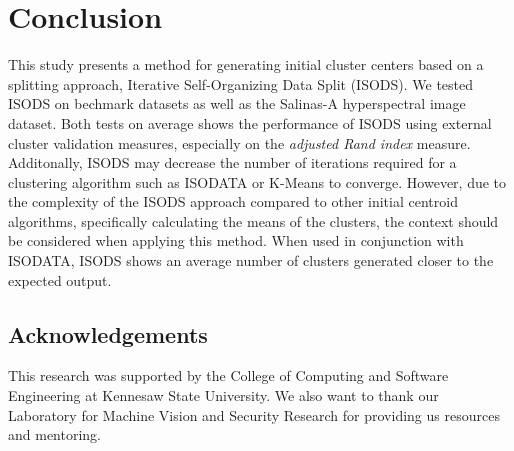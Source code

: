 \documentclass[a4paper, 10pt]{article}
\begin{document}
\section{Conclusion}
This study presents a method for generating initial cluster centers based on a
splitting approach, Iterative Self-Organizing Data Split (ISODS). We tested ISODS on
bechmark datasets as well as the Salinas-A hyperspectral image dataset. Both
tests on average shows the performance of ISODS using external cluster
validation measures, especially on the \textit{adjusted Rand index} measure.
Additonally, ISODS may decrease the number of iterations required for a
clustering algorithm such as ISODATA or K-Means to converge. However, due to the
complexity of the ISODS approach compared to other initial centroid algorithms,
specifically calculating the means of the clusters, the context should be
considered when applying this method. When used in conjunction with ISODATA,
ISODS shows an average number of clusters generated closer to the expected
output.


\subsection*{Acknowledgements}
This research was supported by the College of Computing and Software Engineering
at Kennesaw State University. We also want to thank our Laboratory for Machine
Vision and Security Research for providing us resources and mentoring.

\vspace{5mm}



\end{document}
